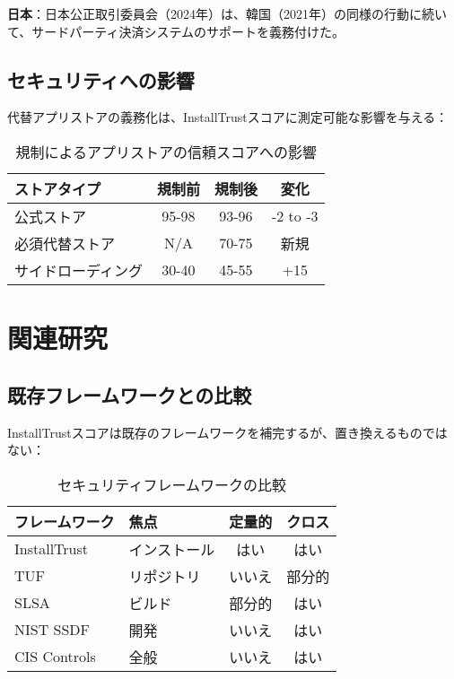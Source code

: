 \documentclass[Specialissue]{jsaiart}
\begin{document}
\textbf{日本}：日本公正取引委員会（2024年）\cite{japan2024appstore}は、韓国（2021年）\cite{korea2021appstore}の同様の行動に続いて、サードパーティ決済システムのサポートを義務付けた。

\subsection{セキュリティへの影響}

代替アプリストアの義務化は、InstallTrustスコアに測定可能な影響を与える：

\begin{table}[ht]
\centering
\caption{規制によるアプリストアの信頼スコアへの影響}
\small
\begin{tabular}{lccc}
\toprule
\rowcolor{headergray}
\textbf{ストアタイプ} & \textbf{規制前} & \textbf{規制後} & \textbf{変化} \\
\midrule
公式ストア & 95-98 & 93-96 & -2 to -3 \\
必須代替ストア & N/A & 70-75 & 新規 \\
サイドローディング & 30-40 & 45-55 & +15 \\
\bottomrule
\end{tabular}
\end{table}

\section{関連研究}

\subsection{既存フレームワークとの比較}

InstallTrustスコアは既存のフレームワークを補完するが、置き換えるものではない：

\begin{table}[ht]
\centering
\caption{セキュリティフレームワークの比較}
\small
\begin{tabular}{p{2.5cm}p{2.0cm}cc}
\toprule
\rowcolor{headergray}
\textbf{フレームワーク} & \textbf{焦点} & \textbf{定量的} & \textbf{クロス} \\
\midrule
InstallTrust & インストール & はい & はい \\
TUF & リポジトリ & いいえ & 部分的 \\
SLSA & ビルド & 部分的 & はい \\
NIST SSDF & 開発 & いいえ & はい \\
CIS Controls & 全般 & いいえ & はい \\
\bottomrule
\end{tabular}
\end{table}
\end{document}
